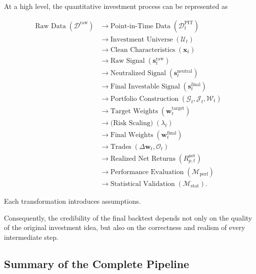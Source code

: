 \documentclass[11pt,a4paper]{article}
\begin{document}
At a high level, the quantitative investment process can be represented as

\begin{equation}
\boxed{
\begin{aligned}
\text{Raw Data}
\;(\mathcal{D}^{\mathrm{raw}})
&\rightarrow
\text{Point-in-Time Data}
\;(\mathcal{D}_t^{\mathrm{PIT}})
\\
&\rightarrow
\text{Investment Universe}
\;(\mathcal{U}_t)
\\
&\rightarrow
\text{Clean Characteristics}
\;(\mathbf{x}_t)
\\
&\rightarrow
\text{Raw Signal}
\;(\mathbf{s}_t^{\mathrm{raw}})
\\
&\rightarrow
\text{Neutralized Signal}
\;(\mathbf{s}_t^{\mathrm{neutral}})
\\
&\rightarrow
\text{Final Investable Signal}
\;(\mathbf{s}_t^{\mathrm{final}})
\\
&\rightarrow
\text{Portfolio Construction}
\;(\mathcal{G}_t,\mathcal{J}_t,\mathcal{W}_t)
\\
&\rightarrow
\text{Target Weights}
\;(\mathbf{w}_t^{\mathrm{target}})
\\
&\rightarrow
\text{(Risk Scaling)}
\;(\lambda_t)
\\
&\rightarrow
\text{Final Weights}
\;(\mathbf{w}_t^{\mathrm{final}})
\\
&\rightarrow
\text{Trades}
\;(\Delta\mathbf{w}_t,\mathcal{O}_t)
\\
&\rightarrow
\text{Realized Net Returns}
\;(R_{p,t}^{\mathrm{net}})
\\
&\rightarrow
\text{Performance Evaluation}
\;(\mathcal{M}_{\mathrm{perf}})
\\
&\rightarrow
\text{Statistical Validation}
\;(\mathcal{M}_{\mathrm{stat}}).
\end{aligned}
}
\end{equation}


Each transformation introduces assumptions.

Consequently, the credibility of the final backtest depends not only on the
quality of the original investment idea, but also on the correctness and
realism of every intermediate step.


\subsection{Summary of the Complete Pipeline}
\label{subsec:summary_complete_pipeline}
\end{document}
